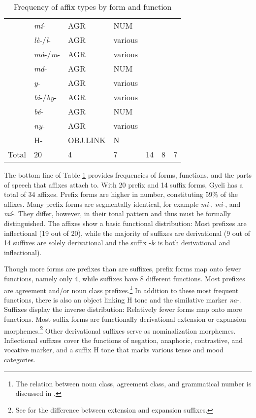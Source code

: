 \begin{table}[!h]
\begin{tabular}{l|lll|lll}
					& {\itshape mí}-		& AGR & NUM			& &  		& 		\\ 
					& {\itshape lè}-/{\itshape l}-		& AGR & various	& &  	& 	\\ 
					& {\itshape mà}-/{\itshape m}-		& AGR & various & &  	& 	\\ 
					& {\itshape má}-		& AGR & NUM 		& &  		& 	 		\\ 
					& {\itshape y}-		& AGR & various	& &  		& 		\\ 
					& {\itshape bì}-/{\itshape by}- & AGR & various & &  		& 	\\ 
					& {\itshape bé}-		& AGR & NUM 			& &  		& 			\\ 
					& {\itshape ny}-		& AGR & various	& &  		& 			\\ 
					& H-		& OBJ.LINK & N 			& &  		& 			\\ 
 \midrule 
Total					& 20 & 4			& 	7		& 14 &  8			& 	7	\\
 \midrule
\end{tabular}
\caption{Frequency of affix types by form and function}
\label{Tab:AffixType}
\end{table} 

The bottom line of Table \ref{Tab:AffixType} provides frequencies of forms, functions, and the parts of speech that affixes attach to. With 20 prefix and 14 suffix forms, Gyeli has a total of 34 affixes. Prefix forms are higher in number, constituting 59\% of the affixes.  Many prefix forms are segmentally identical, for example {\itshape mi}-, {\itshape mì}-, and {\itshape mí}-. They differ, however, in their tonal pattern and thus must  be formally distinguished. The affixes show a basic functional distribution:  Most prefixes are inflectional (19 out of 20), while the majority of suffixes are derivational (9 out of 14 suffixes are solely derivational and the suffix -{\itshape lɛ} is both derivational and inflectional).

Though more forms are prefixes than are suffixes, prefix forms map onto fewer functions, namely only 4, while suffixes have 8 different functions. Most prefixes are agreement and/or noun class prefixes.\footnote{The relation between noun class, agreement class, and grammatical number is discussed in .} In addition to these most frequent functions, there is also an object linking H tone and the similative marker {\itshape na}-. Suffixes display the inverse distribution: Relatively fewer forms map onto more functions. Most suffix forms are functionally derivational extension or expansion morphemes.\footnote{See  for the difference between extension and expansion suffixes.} Other derivational suffixes serve as nominalization morphemes. Inflectional suffixes cover the functions of negation, anaphoric, contrastive, and vocative marker, and a suffix H tone that marks various tense and mood categories. 

